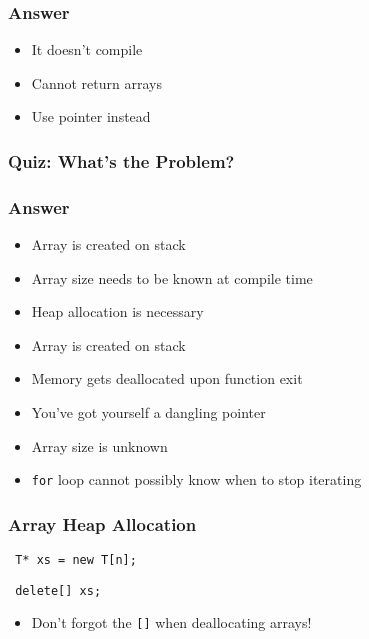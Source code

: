 \documentclass[handout]{ucll-slides}
\begin{document}
\begin{frame}
  \frametitle{Answer}
  \Large
  \begin{itemize}
    \item It doesn't compile
    \item Cannot return arrays
    \item Use pointer instead
   \end{itemize}
\end{frame}

\begin{frame}
  \frametitle{Quiz: What's the Problem?}
\end{frame}

\begin{frame}
  \frametitle{Answer}
  \begin{itemize}
    \item Array is created on stack
    \item Array size needs to be known at compile time
    \item Heap allocation is necessary
  \end{itemize}
  \vskip5mm
  \begin{itemize}
    \item Array is created on stack
    \item Memory gets deallocated upon function exit
    \item You've got yourself a dangling pointer
  \end{itemize}
  \vskip5mm
  \begin{itemize}
    \item Array size is unknown
    \item {\tt for} loop cannot possibly know when to stop iterating
  \end{itemize}
\end{frame}

\begin{frame}
  \frametitle{Array Heap Allocation}
  \begin{center} \tt
    T* xs = new T[n];
  \end{center}
  \vskip5mm
  \begin{center} \tt
    delete[] xs;
  \end{center}
  \begin{itemize}
    \item Don't forgot the {\tt []} when deallocating arrays!
  \end{itemize}
\end{frame}
\end{document}
